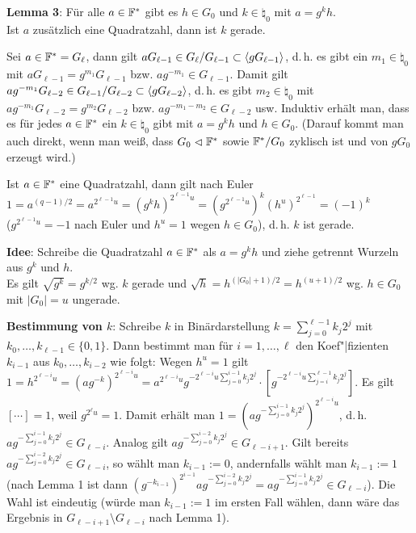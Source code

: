 
\textbf{Lemma 3}:
Für alle $a \in \mathbb{F}^\ast$ gibt es $h \in G_0$ und $k \in \natural_0$ mit $a = g^k h$.\\
Ist $a$ zusätzlich eine Quadratzahl, dann ist $k$ gerade.

\begin{Beweis}
    Sei $a \in \mathbb{F}^\ast = G_\ell$, dann gilt $aG_{\ell-1} \in G_\ell/G_{\ell-1} \subset
    \langle gG_{\ell-1}\rangle$, d.\,h. es gibt ein $m_1 \in \natural_0$ mit
    $a G_{\ell-1} = g^{m_1} G_{\ell-1}$ bzw. $ag^{-m_1} \in G_{\ell-1}$.
    Damit gilt
    $ag^{-m_1} G_{\ell-2} \in G_{\ell-1}/G_{\ell-2} \subset \langle gG_{\ell-2}\rangle$, d.\,h.
    es gibt $m_2 \in \natural_0$ mit $ag^{-m_1} G_{\ell-2} = g^{m_2} G_{\ell-2}$ bzw.
    $ag^{-m_1-m_2} \in G_{\ell-2}$ usw.
    Induktiv erhält man, dass es für jedes $a \in \mathbb{F}^\ast$ ein $k \in \natural_0$ gibt mit
    $a = g^k h$ und $h \in G_0$.
    (Darauf kommt man auch direkt, wenn man weiß, dass $G_0 \vartriangleleft \mathbb{F}^\ast$
    sowie $\mathbb{F}^\ast/G_0$ zyklisch ist und von $gG_0$ erzeugt wird.)

    Ist $a \in \mathbb{F}^\ast$ eine Quadratzahl, dann gilt nach Euler\\
    $1 = a^{(q-1)/2} = a^{2^{\ell-1} u} = (g^k h)^{2^{\ell-1} u}
    = (g^{2^{\ell-1} u})^k (h^u)^{2^{\ell-1}} = (-1)^k$\\
    ($g^{2^{\ell-1} u} = -1$ nach Euler und $h^u = 1$ wegen $h \in G_0$),
    d.\,h. $k$ ist gerade.
\end{Beweis}

\linie
\pagebreak

\textbf{Idee}:
Schreibe die Quadratzahl $a \in \mathbb{F}^\ast$ als $a = g^k h$ und ziehe getrennt
Wurzeln aus $g^k$ und $h$.\\
Es gilt $\sqrt{g^k} = g^{k/2}$ wg. $k$ gerade und
$\sqrt{h} = h^{(|G_0|+1)/2} = h^{(u+1)/2}$ wg. $h \in G_0$ mit
$|G_0| = u$ ungerade.

\textbf{Bestimmung von $k$}:
Schreibe $k$ in Binärdarstellung $k = \sum_{j=0}^{\ell-1} k_j 2^j$ mit
$k_0, \dotsc, k_{\ell-1} \in \{0, 1\}$.
Dann bestimmt man für $i = 1, \dotsc, \ell$ den Koef"|fizienten $k_{i-1}$ aus
$k_0, \dotsc, k_{i-2}$ wie folgt:
Wegen $h^u = 1$ gilt $1 = h^{2^{\ell-i}u} = (ag^{-k})^{2^{\ell-i}u}
= a^{2^{\ell-i}u} g^{-2^{\ell-i} u \sum_{j=0}^{i-1} k_j 2^j}
\cdot [g^{-2^{\ell-i} u \sum_{j=i}^{\ell-1} k_j 2^j}]$.
Es gilt $[\cdots] = 1$, weil $g^{2^\ell u} = 1$.
Damit erhält man
$1 = (ag^{-\sum_{j=0}^{i-1} k_j 2^j})^{2^{\ell-i} u}$, d.\,h.
$ag^{-\sum_{j=0}^{i-1} k_j 2^j} \in G_{\ell-i}$.
Analog gilt $ag^{-\sum_{j=0}^{i-2} k_j 2^j} \in G_{\ell-i+1}$.
Gilt bereits $ag^{-\sum_{j=0}^{i-2} k_j 2^j} \in G_{\ell-i}$,
so wählt man $k_{i-1} := 0$,
andernfalls wählt man $k_{i-1} := 1$
(nach Lemma 1 ist dann $(g^{-k_{i-1}})^{2^{i-1}} ag^{-\sum_{j=0}^{i-2} k_j 2^j}
= ag^{-\sum_{j=0}^{i-1} k_j 2^j} \in G_{\ell-i}$).
Die Wahl ist eindeutig (würde man $k_{i-1} := 1$ im ersten Fall wählen,
dann wäre das Ergebnis in $G_{\ell-i+1} \setminus G_{\ell-i}$ nach Lemma 1).

